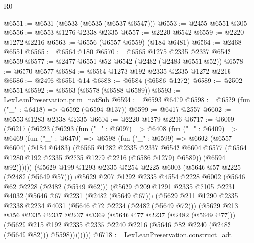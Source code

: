 \begin{lexlean}{R0}
\begin{coremodule}
@6551 := @6531 (@6533 (@6535 (@6537 @6547)))
@6553 := @2455 @6551 @305
@6556 := @6553 @1276 @2338 @2335
@6557 := @2220 @6542
@6559 := @2220 @1272 @2216
@6563 := @6556 (@6557 @6559) (@184 @6481)
@6564 := @2468 @6551
@6565 := @6564 @180
@6570 := @6565 @1275 @2335 @2337 @6542 @6559
@6577 := @2477 @6551 @52 @6542 (@2482 (@2483 @6551 @52))
@6578 := @6570 @6577
@6584 := @6564 @1273 @192 @2335 @2335 @1272 @2216
@6586 := @2496 @6551 @14
@6588 := @6584 (@6586 @1272)
@6589 := @2502 @6551
@6592 := @6563 (@6578 (@6588 @6589))
@6593 := LexLeanPreservation.prim_natSub
@6594 := @6593 @6479
@6598 := @6529 (fun ("_" : @6418) => @6592 (@6594 @137))
@6599 := @6417 @2557
@6602 := @6553 @1283 @2338 @2335
@6604 := @2220 @1279 @2216
@6717 := @6009
    (@6217
      (@6223
        (@6293
          (fun ("_" : @6097) =>
          @6408
            (fun ("_" : @6409) =>
            @6469
              (fun ("_" : @6470) =>
              @6598
                (fun ("_" : @6599) =>
                @6602
                  (@6557 @6604)
                  (@184 @6483)
                  (@6565
                    @1282
                    @2335
                    @2337
                    @6542
                    @6604
                    @6577
                    (@6564 @1280 @192 @2335 @2335 @1279 @2216 (@6586 @1279) @6589))
                  (@6594 @92))))))
        (@5629
          @199
          @1293
          @2335
          @5254
          @2225
          @6003
          (@5646 @57 @2225 (@2482 (@5649 @57)))
          (@5629
            @207
            @1292
            @2335
            @4554
            @2228
            @6002
            (@5646 @62 @2228 (@2482 (@5649 @62)))
            (@5629
              @209
              @1291
              @2335
              @3105
              @2231
              @4032
              (@5646 @67 @2231 (@2482 (@5649 @67)))
              (@5629
                @211
                @1290
                @2335
                @2338
                @2234
                @4031
                (@5646 @72 @2234 (@2482 (@5649 @72)))
                (@5629
                  @213
                  @356
                  @2335
                  @2337
                  @2237
                  @3369
                  (@5646 @77 @2237 (@2482 (@5649 @77)))
                  (@5629
                    @215
                    @192
                    @2335
                    @2335
                    @2240
                    @2216
                    (@5646 @82 @2240 (@2482 (@5649 @82)))
                    @5598))))))))
@6718 := LexLeanPreservation.construct_adt

\end{coremodule}
\end{lexlean}
